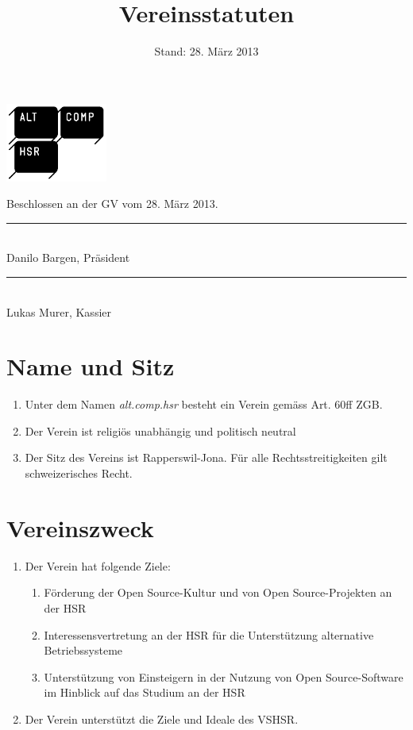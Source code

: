 \documentclass[10pt,a4paper,parskip,fleqn]{scrartcl}
\title{\Huge Vereinsstatuten}
\date{Stand: 28. März 2013}
\newcommand{\ol}{\begin{enumerate}[itemsep=-0.2em,topsep=-0.2em]}
\newcommand{\lo}{\end{enumerate}}
\newcommand{\li}{\item}
\begin{document}
\begin{titlepage}
  \maketitle
  \thispagestyle{empty} %
  \begin{center}
    \includegraphics[width=0.25\textwidth]{logo.png}\\

    \vfill

    \large Beschlossen an der GV vom 28. März 2013.

    \vspace{1.5cm}

    \begin{minipage}[t]{0.49\textwidth}
      \center
      \rule{5cm}{0.2mm}\\
      Danilo Bargen, Präsident
    \end{minipage}
    \begin{minipage}[t]{0.49\textwidth}
      \center
      \rule{5cm}{0.2mm}\\
      Lukas Murer, Kassier
    \end{minipage}
  \end{center}
\end{titlepage}


\section{Name und Sitz}

\ol
  \li Unter dem Namen \textit{alt.comp.hsr} besteht ein Verein gemäss Art. 60ff
  ZGB.
  \li Der Verein ist religiös unabhängig und politisch neutral
  \li Der Sitz des Vereins ist Rapperswil-Jona. Für alle Rechtsstreitigkeiten
  gilt schweizerisches Recht.
\lo


\section{Vereinszweck}

\ol
  \li Der Verein hat folgende Ziele:
    \ol
      \li Förderung der Open Source-Kultur und von Open Source-Projekten an
      der HSR
      \li Interessensvertretung an der HSR für die Unterstützung
      alternative Betriebssysteme
      \li Unterstützung von Einsteigern in der Nutzung von Open
      Source-Software im Hinblick auf das Studium an der HSR
    \lo
  \li Der Verein unterstützt die Ziele und Ideale des VSHSR. 
\lo
\end{document}
